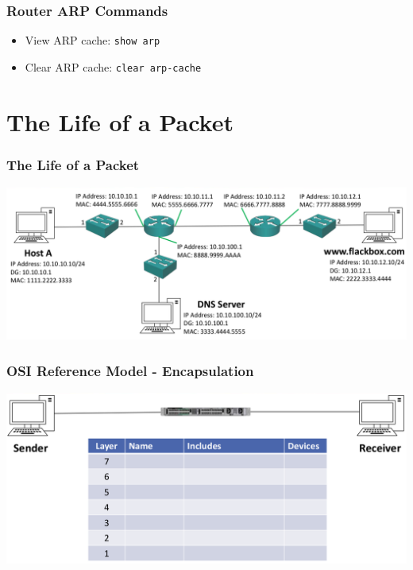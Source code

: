 \documentclass[pdflatex,compress,mathserif]{beamer}
\begin{document}
\begin{frame}
	\frametitle{Router ARP Commands}
	\begin{itemize}
		\item View ARP cache: \texttt{show arp}
		\item Clear ARP cache: \texttt{clear arp-cache}
	\end{itemize}
\end{frame}

\section{The Life of a Packet}

\begin{frame}
	\frametitle{The Life of a Packet}
	\begin{center}
		\includegraphics[width=\linewidth]{img/img14}
	\end{center}
\end{frame}

\begin{frame}
	\frametitle{OSI Reference Model - Encapsulation}
	\begin{center}
		\includegraphics[width=\linewidth]{img/img01}
	\end{center}
\end{frame}
\end{document}
